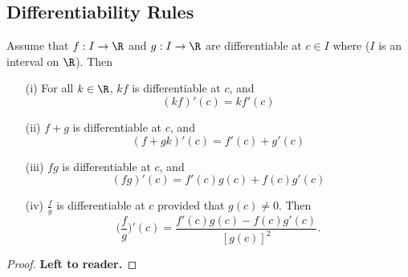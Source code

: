 \subsection{Differentiability Rules}\label{Differentiability Rules}

\begin{theorem}
    Assume that \( f: I \to \R  \) and \( g : I \to \R  \) are differentiable at \( c \in I  \) where (\( I  \) is an interval on \( \R  \)). Then
    \begin{enumerate}
        \item[(i)] For all \( k \in \R  \), \( kf  \) is differentiable at \( c  \), and
            \[  (kf)'(c) = k f'(c) \]
        \item[(ii)] \( f+ g  \) is differentiable at \( c  \), and 
            \[  (f+gk)'(c) = f'(c) + g'(c) \]
        \item[(iii)] \( fg  \) is differentiable at \( c  \), and 
            \[  (fg)'(c) = f'(c) g(c) + f(c) g'(c) \]
        \item[(iv)] \( \frac{ f }{ g }  \) is differentiable at \( c  \) provided that \( g(c) \neq 0  \). Then
            \[  \Big(  \frac{ f }{ g }  \Big)' (c) = \frac{ f'(c) g(c) - f(c) g'(c) }{ [g(c)]^{2} }. \]
    \end{enumerate} 
\end{theorem}

\begin{proof}
\textbf{Left to reader.}
\end{proof}



